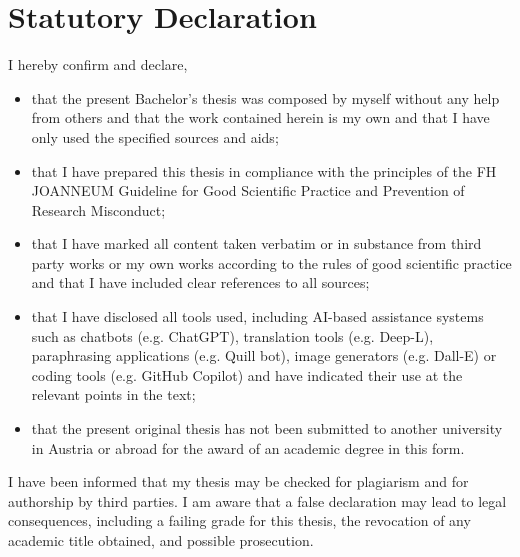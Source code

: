 \section*{Statutory Declaration}
I hereby confirm and declare,

\begin{itemize}
    \item that the present Bachelor's thesis was composed by myself without any help from others
          and that the work contained herein is my own and that I have only used the specified
          sources and aids;
    \item that I have prepared this thesis in compliance with the principles of the FH
          JOANNEUM Guideline for Good Scientific Practice and Prevention of Research Misconduct;
    \item that I have marked all content taken verbatim or in substance from third party works or
          my own works according to the rules of good scientific practice and that I have included
          clear references to all sources;
    \item that I have disclosed all tools used, including AI-based assistance systems such as
          chatbots (e.g. ChatGPT), translation tools (e.g. Deep-L), paraphrasing applications (e.g.
          Quill bot), image generators (e.g. Dall-E) or coding tools (e.g. GitHub Copilot)
          and have indicated their use at the relevant points in the text;
    \item that the present original thesis has not been submitted to another university in Austria
          or abroad for the award of an academic degree in this form.
\end{itemize}

I have been informed that my thesis may be checked for plagiarism and for authorship by third
parties. I am aware that a false declaration may lead to legal consequences, including a failing
grade for this thesis, the revocation of any academic title obtained, and possible prosecution.
